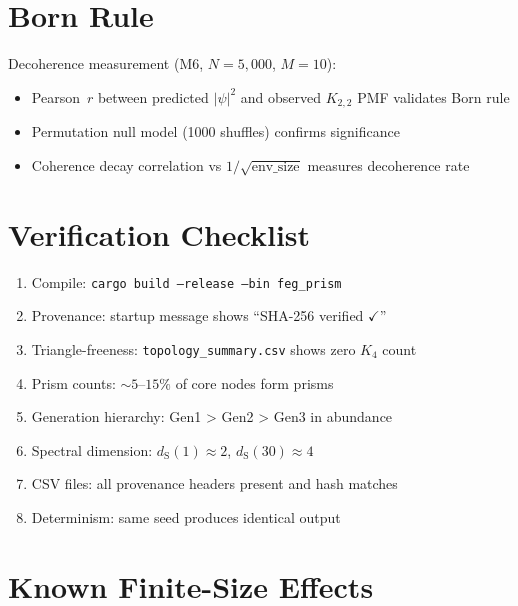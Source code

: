 \documentclass[11pt, a4paper, openany]{book}
\newcommand{\dS}{d_{\mathrm{S}}}
\newcommand{\code}[1]{\texttt{#1}}
\begin{document}
\section{Born Rule}

\begin{result}
  Decoherence measurement (M6, $N = 5{,}000$, $M = 10$):
  \begin{itemize}
    \item Pearson~$r$ between predicted $|\psi|^2$ and observed $K_{2,2}$ PMF validates Born rule
    \item Permutation null model (1000 shuffles) confirms significance
    \item Coherence decay correlation vs $1/\sqrt{\text{env\_size}}$ measures decoherence rate
  \end{itemize}
\end{result}

\section{Verification Checklist}

\begin{enumerate}
  \item Compile: \code{cargo build --release --bin feg\_prism}
  \item Provenance: startup message shows ``SHA-256 verified $\checkmark$''
  \item Triangle-freeness: \code{topology\_summary.csv} shows zero $K_4$ count
  \item Prism counts: $\sim 5$--$15\%$ of core nodes form prisms
  \item Generation hierarchy: Gen1 > Gen2 > Gen3 in abundance
  \item Spectral dimension: $\dS(1) \approx 2$, $\dS(30) \approx 4$
  \item CSV files: all provenance headers present and hash matches
  \item Determinism: same seed produces identical output
\end{enumerate}

\section{Known Finite-Size Effects}
\end{document}
